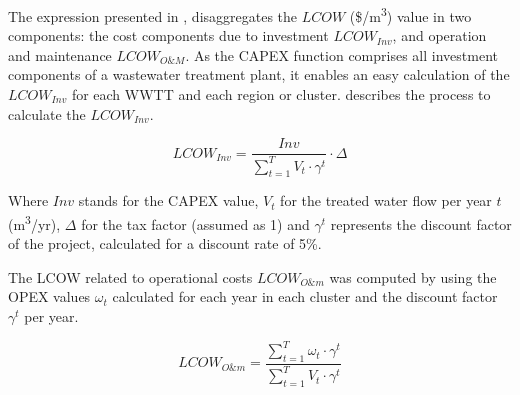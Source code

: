 The expression presented in , disaggregates the $LCOW$ (\$/m\textsuperscript{3}) value in two components: the cost components due to investment $LCOW_{Inv}$, and operation and maintenance $LCOW_{O\&M}$. As the CAPEX function comprises all investment components of a wastewater treatment plant, it enables an easy calculation of the $LCOW_{Inv}$ for each WWTT and each region or cluster.  describes the process to calculate the $LCOW_{Inv}$.

\begin{equation}\label{eq:lcowinv}
LCOW_{Inv} = \frac{Inv}{\sum_{t=1}^{T} V_{t}\cdot\gamma^{t}}\cdot\Delta
\end{equation}

Where $Inv$ stands for the CAPEX value, $V_{t}$ for the treated water flow per year $t$ (m\textsuperscript{3}/yr), $\Delta$ for the tax factor (assumed as 1) and $\gamma^{t}$ represents the discount factor of the project, calculated for a discount rate of 5\%.

The LCOW related to operational costs $LCOW_{O\&m}$  was computed by using the OPEX values $\omega_{t}$ calculated for each year in each cluster and the discount factor $\gamma^t$ per year.

\begin{equation}\label{eq:lcowom}
LCOW_{O\&m} = \frac{\sum_{t=1}^{T} \omega_{t}\cdot\gamma^{t}}{\sum_{t=1}^{T} V_{t}\cdot\gamma^{t}}
\end{equation}


